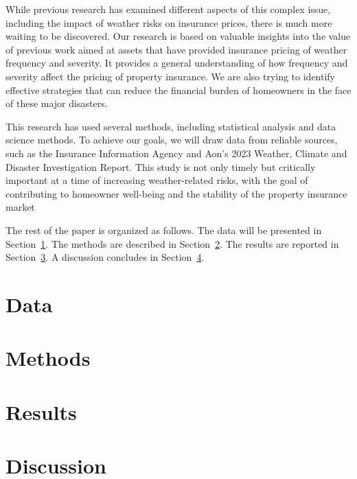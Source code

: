 \documentclass[12pt]{article}
\begin{document}
While previous research has examined different aspects of this complex issue, including the impact of weather risks on insurance 
prices, there is much more waiting to be discovered. Our research is based on valuable insights into the value of previous work 
\cite{hurricaneco} aimed at assets that have provided insurance pricing of weather frequency and severity. It provides a general 
understanding of how frequency and severity affect the pricing of property insurance. We are also trying to identify effective 
strategies that can reduce the financial burden of homeowners in the face of these major disasters.


This research has used several methods, including statistical analysis and data science methods. To achieve our goals, we will draw 
data from reliable sources, such as the Insurance Information Agency and Aon's 2023 Weather, Climate and Disaster Investigation Report. 
This study is not only timely but critically important at a time of increasing weather-related risks, with the goal of contributing to 
homeowner well-being and the stability of the property insurance market

The rest of the paper is organized as follows.
The data will be presented in Section~\ref{sec:data}.
The methods are described in Section~\ref{sec:meth}.
The results are reported in Section~\ref{sec:resu}.
A discussion concludes in Section~\ref{sec:disc}.


\section{Data}
\label{sec:data}



\section{Methods}
\label{sec:meth}




\section{Results}
\label{sec:resu}




\section{Discussion}
\label{sec:disc}





\end{document}
